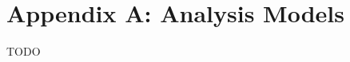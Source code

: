 \documentclass{scrreprt}
\begin{document}



\section{Appendix A: Analysis Models}

TODO



\end{document}
